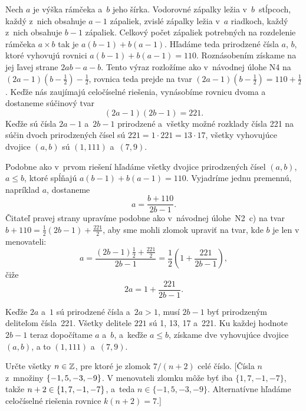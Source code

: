 {%
Nech $a$ je výška rámčeka a~$b$ jeho šírka.
Vodorovné zápalky ležia v~$b$~stĺpcoch, každý z~nich obsahuje $a-1$ zápaliek, zvislé zápalky ležia v~$a$ riadkoch, každý z~nich obsahuje $b-1$ zápaliek.
Celkový počet zápaliek potrebných
na rozdelenie rámčeka $a\times b$ tak je $a(b-1)+b(a-1)$. Hľadáme teda prirodzené čísla $a$, $b$, ktoré vyhovujú rovnici $a(b-1)+b(a-1)=110$. Roznásobením získame na jej ľavej strane $2ab-a-b$. Tento výraz rozložíme ako v~návodnej úlohe N4 na $(2a-1)(b-\frac12)-\frac12$, rovnica teda prejde na tvar $(2a-1)(b-\tfrac12)=110+\frac12$. Keďže nás zaujímajú celočíselné riešenia, vynásobíme rovnicu dvoma a dostaneme súčinový tvar
$$
(2a-1)(2b-1)=221.
$$
Keďže sú čísla $2a-1$ a~$2b-1$ prirodzené a~všetky možné rozklady čísla 221 na súčin dvoch prirodzených čísel sú $221=1\cdot 221=13\cdot 17$, všetky vyhovujúce dvojice $(a,b)$ sú $(1,111)$ a~$(7,9)$.

\ineriesenie
Podobne ako v~prvom riešení hľadáme všetky dvojice prirodzených čísel $(a,b)$, $a\le b$, ktoré spĺňajú
$a(b-1)+b(a-1) = 110$. Vyjadríme jednu premennú, napríklad $a$, dostaneme
$$a = \frac{b+110}{2b - 1}. $$
Čitateľ pravej strany upravíme podobne ako v~návodnej úlohe~N2~c) na tvar $b+110={\tfrac12(2b-1) + \tfrac{221}2}$, aby sme mohli zlomok upraviť na tvar, kde $b$ je len v menovateli:
$$
a=\frac{(2b-1)\tfrac12 + \tfrac{221}2}{2b-1}=\frac12\left(1+ \frac{221}{2b - 1}\right),
$$
čiže
$$
2a=1+ \frac{221}{2b - 1}.
$$

Keďže $2a$ a~$1$ sú prirodzené čísla a~$2a>1$, musí $2b-1$ byť prirodzeným deliteľom čísla~221. Všetky delitele $221$ sú 1, 13, 17 a~221. Ku každej hodnote $2b-1$ teraz dopočítame $a$ a~$b$, a~keďže $a\le b$, získame dve vyhovujúce dvojice $(a,b)$, a to $(1,111)$ a~$(7,9)$.


Určte všetky $n\in\Bbb Z$, pre ktoré je zlomok
${7}/{(n+2)}$ celé číslo. [Čísla $n$ z~množiny $\{{-1},5,\penalty 50{-3},{-9}\}$. V menovateli zlomku môže byť iba $\{1,7,-1, -7\}$,
takže
$n+2\in\{1,7,\penalty 50{-1},{-7}\}$, a~teda
$n\in\{-1,5,-3,-9\}$. Alternatívne hľadáme celočíselné riešenia rovnice $k(n+2)=7$.]

}
